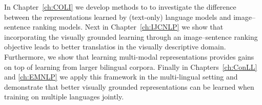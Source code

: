 In Chapter~\ref{ch:COLI} we develop methods to 
to investigate the difference between the representations learned by (text-only) language
models and image--sentence ranking models.
Next in Chapter~\ref{ch:IJCNLP} we show that incorporating
the visually grounded learning through an image--sentence ranking objective 
leads to better translatios in the visually descriptive domain. Furthermore, 
we show that learning multi-modal representations provides gains on top of learning 
from larger bilingual corpora.
Finally in Chapters~\ref{ch:ConLL} and \ref{ch:EMNLP} we apply this 
framework in the multi-lingual setting and demonstrate
that better visually grounded representations can be learned when training on multiple
languages jointly. 









